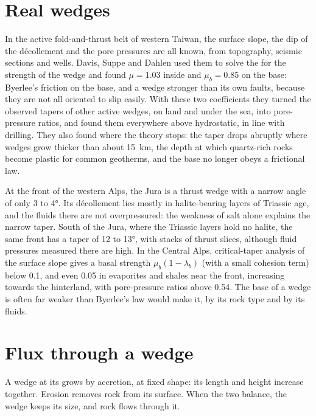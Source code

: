 \section{Real wedges}\label{sec:b3:orogenic-wedges:real}

In the active fold-and-thrust belt of western Taiwan, the surface slope, the
dip of the décollement and the pore pressures are all known, from topography,
seismic sections and wells. Davis, Suppe and Dahlen used them to solve the
 for the strength of the wedge and found $\mu = 1.03$
inside and $\mu_b = 0.85$ on the base: Byerlee's friction on the base, and a
wedge stronger than its own faults, because they are not all oriented to slip
easily. With these two coefficients they turned the observed tapers of other
active wedges, on land and under the sea, into pore-pressure ratios, and found
them everywhere above hydrostatic, in line with drilling. They also found
where the theory stops: the taper drops abruptly where wedges grow thicker
than about \qty{15}{km}, the depth at which quartz-rich rocks become plastic
for common geotherms, and the base no longer obeys a frictional law.

At the front of the western Alps, the Jura is a thrust wedge with a narrow
angle of only 3 to \ang{4}. Its décollement lies mostly in halite-bearing
layers of Triassic age, and the fluids there are not overpressured: the
weakness of salt alone explains the narrow taper. South of the Jura, where the
Triassic layers hold no halite, the same front has a taper of 12 to
\ang{13}, with stacks of thrust slices, although fluid pressures measured
there are high. In the Central Alps, critical-taper analysis of the surface
slope gives a basal strength $\mu_b(1 - \lambda_b)$ (with a small cohesion
term) below 0.1, and even 0.05 in evaporites and shales near the front,
increasing towards the hinterland, with pore-pressure ratios above 0.54. The
base of a wedge is often far weaker than Byerlee's law would make it, by its
rock type and by its fluids.

\section{Flux through a wedge}\label{sec:b3:orogenic-wedges:flux}

A wedge at its  grows by accretion, at fixed shape: its length
and height increase together. Erosion removes rock from its surface. When the
two balance, the wedge keeps its size, and rock flows through it.

